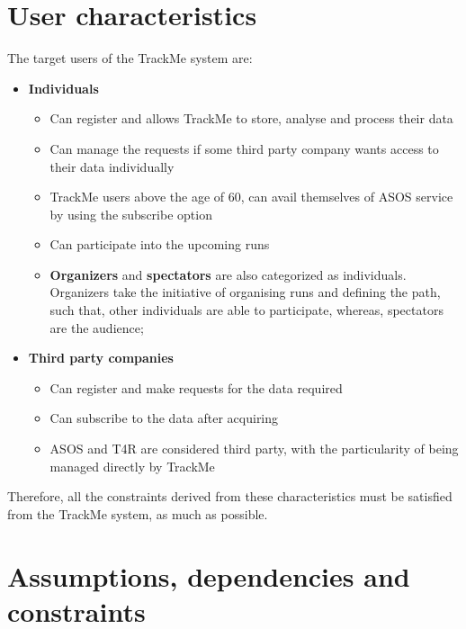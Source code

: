 \documentclass[hidelinks, 12pt]{report}
\begin{document}
\section{User characteristics}
The target users of the TrackMe system are:
\begin{itemize}
\item{} \textbf{Individuals} 
\begin{itemize}
\item{} Can register and allows TrackMe to store, analyse and process their data
\item{} Can manage the requests if some third party company wants access to their data individually
\item{} TrackMe users above the age of 60, can avail themselves of ASOS service by using the subscribe option
\item{} Can participate into the upcoming runs
\item{} \textbf{Organizers} and \textbf{spectators} are also categorized as individuals. Organizers take the initiative of organising runs and defining the path, such that, other individuals are able to participate, whereas, spectators are the audience;

\end{itemize}
\item{} \textbf{Third party companies}
\begin{itemize}
\item{} Can register and make requests for the data required
\item{} Can subscribe to the data after acquiring
\item{} ASOS and T4R are considered third party, with the particularity of being managed directly by TrackMe
\end{itemize}
\end{itemize}

Therefore, all the constraints derived from these characteristics must be satisfied from the TrackMe system, as much as possible.

\section{Assumptions, dependencies and constraints}
\end{document}
